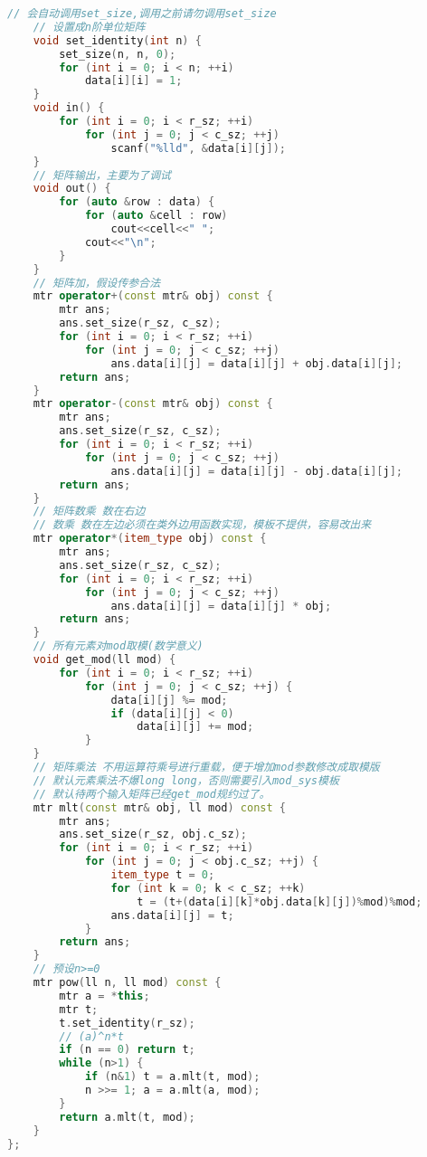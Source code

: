 \begin{lstlisting}[language={c++}]
    // 会自动调用set_size,调用之前请勿调用set_size
    // 设置成n阶单位矩阵
    void set_identity(int n) {
        set_size(n, n, 0);
        for (int i = 0; i < n; ++i)
            data[i][i] = 1;
    }
    void in() {
        for (int i = 0; i < r_sz; ++i)
            for (int j = 0; j < c_sz; ++j)
                scanf("%lld", &data[i][j]);
    }
    // 矩阵输出，主要为了调试
    void out() {
        for (auto &row : data) {
            for (auto &cell : row)
                cout<<cell<<" ";
            cout<<"\n";
        }
    }
    // 矩阵加，假设传参合法
    mtr operator+(const mtr& obj) const {
        mtr ans;
        ans.set_size(r_sz, c_sz);
        for (int i = 0; i < r_sz; ++i)
            for (int j = 0; j < c_sz; ++j)
                ans.data[i][j] = data[i][j] + obj.data[i][j];
        return ans;
    }
    mtr operator-(const mtr& obj) const {
        mtr ans;
        ans.set_size(r_sz, c_sz);
        for (int i = 0; i < r_sz; ++i)
            for (int j = 0; j < c_sz; ++j)
                ans.data[i][j] = data[i][j] - obj.data[i][j];
        return ans;
    }
    // 矩阵数乘 数在右边
    // 数乘 数在左边必须在类外边用函数实现，模板不提供，容易改出来
    mtr operator*(item_type obj) const {
        mtr ans;
        ans.set_size(r_sz, c_sz);
        for (int i = 0; i < r_sz; ++i)
            for (int j = 0; j < c_sz; ++j)
                ans.data[i][j] = data[i][j] * obj;
        return ans;
    }
    // 所有元素对mod取模(数学意义)
    void get_mod(ll mod) {
        for (int i = 0; i < r_sz; ++i)
            for (int j = 0; j < c_sz; ++j) {
                data[i][j] %= mod;
                if (data[i][j] < 0)
                    data[i][j] += mod;
            }
    }
    // 矩阵乘法 不用运算符乘号进行重载，便于增加mod参数修改成取模版
    // 默认元素乘法不爆long long，否则需要引入mod_sys模板
    // 默认待两个输入矩阵已经get_mod规约过了。
    mtr mlt(const mtr& obj, ll mod) const {
        mtr ans;
        ans.set_size(r_sz, obj.c_sz);
        for (int i = 0; i < r_sz; ++i)
            for (int j = 0; j < obj.c_sz; ++j) {
                item_type t = 0;
                for (int k = 0; k < c_sz; ++k)
                    t = (t+(data[i][k]*obj.data[k][j])%mod)%mod;
                ans.data[i][j] = t;
            }
        return ans;
    }
    // 预设n>=0
    mtr pow(ll n, ll mod) const {
        mtr a = *this;
        mtr t;
        t.set_identity(r_sz);
        // (a)^n*t
        if (n == 0) return t;
        while (n>1) {
            if (n&1) t = a.mlt(t, mod);
            n >>= 1; a = a.mlt(a, mod);
        }
        return a.mlt(t, mod);
    }
};
        \end{lstlisting}